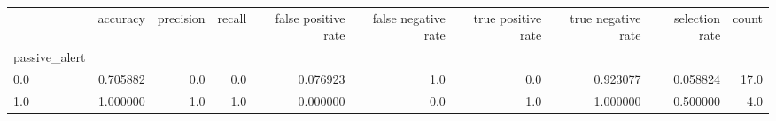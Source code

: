 \begin{tabular}{lrrrrrrrrr}
\toprule
{} &  accuracy &  precision &  recall &  false positive rate &  false negative rate &  true positive rate &  true negative rate &  selection rate &  count \\
passive\_alert &           &            &         &                      &                      &                     &                     &                 &        \\
\midrule
0.0           &  0.705882 &        0.0 &     0.0 &             0.076923 &                  1.0 &                 0.0 &            0.923077 &        0.058824 &   17.0 \\
1.0           &  1.000000 &        1.0 &     1.0 &             0.000000 &                  0.0 &                 1.0 &            1.000000 &        0.500000 &    4.0 \\
\bottomrule
\end{tabular}
